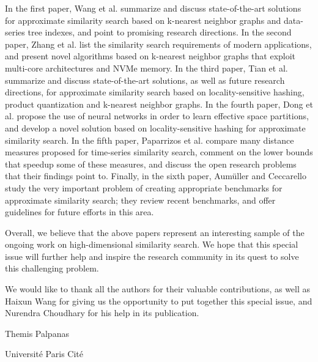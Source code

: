 \documentclass[11pt]{article}
\begin{document}
In the first paper, Wang et al. summarize and discuss state-of-the-art solutions for approximate similarity search based on k-nearest neighbor graphs and data-series tree indexes, and point to promising research directions.
In the second paper, Zhang et al. list the similarity search requirements of modern applications, and present novel algorithms based on k-nearest neighbor graphs that exploit multi-core architectures and NVMe memory.
In the third paper, Tian et al. summarize and discuss state-of-the-art solutions, as well as future research directions, for approximate similarity search based on locality-sensitive hashing, product quantization and k-nearest neighbor graphs.
In the fourth paper, Dong et al. propose the use of neural networks in order to learn effective space partitions, and develop a novel solution based on locality-sensitive hashing for approximate similarity search.
In the fifth paper, Paparrizos et al. compare many distance measures proposed for time-series similarity search, comment on the lower bounds that speedup some of these measures, and discuss the open research problems that their findings point to. 
Finally, in the sixth paper, Aum\"{u}ller and Ceccarello study the very important problem of creating appropriate benchmarks for approximate similarity search; they review recent benchmarks, and offer guidelines for future efforts in this area.

Overall, we believe that the above papers represent an interesting sample of the ongoing work on high-dimensional similarity search. 
We hope that this special issue will further help and inspire the research community in its quest to solve this challenging problem.

We would like to thank all the authors for their valuable contributions, as well as Haixun Wang for giving us the opportunity to put together this special issue, and Nurendra Choudhary for his help in its publication.

Themis Palpanas

Universit{\'e} Paris Cit{\'e}
\end{document}
